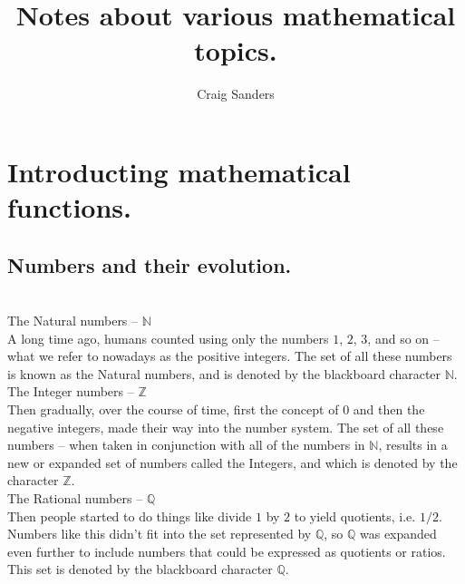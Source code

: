 \documentclass{article}
\title{Notes about various mathematical topics.}
\author{Craig Sanders}
\date{ }
\begin{document}
\newpage

\maketitle

\newpage

\tableofcontents

\newpage

\listoffigures


\newpage

\section{Introducting mathematical functions.}

\subsection{Numbers and their evolution.}

\noindent
\\
\textbullet \; The Natural numbers -- $\mathbb{N}$\\

A long time ago, humans counted using only the numbers $1$, $2$, $3$, and so on -- what we refer to nowadays
as the positive integers. The set of all these numbers is known as the Natural numbers, and is denoted by the
blackboard character $\mathbb{N}$.\\

\textbullet \; The Integer numbers -- $\mathbb{Z}$\\

Then gradually, over the course of time, first the concept of $0$ and then the negative integers, made their way
into the number system. The set of all these numbers -- when taken in conjunction with all of the numbers in 
$\mathbb{N}$, results in a new or expanded set of numbers called the Integers, and which is denoted by the
character $\mathbb{Z}$.\\

\textbullet \; The Rational numbers -- $\mathbb{Q}$\\

Then people started to do things like divide $1$ by $2$ to yield quotients, i.e. $1/2$. Numbers like this didn't
fit into the set represented by $\mathbb{Q}$, so $\mathbb{Q}$ was expanded even further to include numbers that
could be expressed as quotients or ratios. This set is denoted by the blackboard character $\mathbb{Q}$.\\
\end{document}
